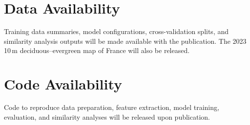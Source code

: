 \documentclass[utf8]{FrontiersinHarvard}
\begin{document}
\section*{Data Availability}
Training data summaries, model configurations, cross-validation splits, and similarity analysis outputs will be made available with the publication. The 2023 10\,m deciduous–evergreen map of France will also be released.

\section*{Code Availability}
Code to reproduce data preparation, feature extraction, model training, evaluation, and similarity analyses will be released upon publication.



\end{document}

